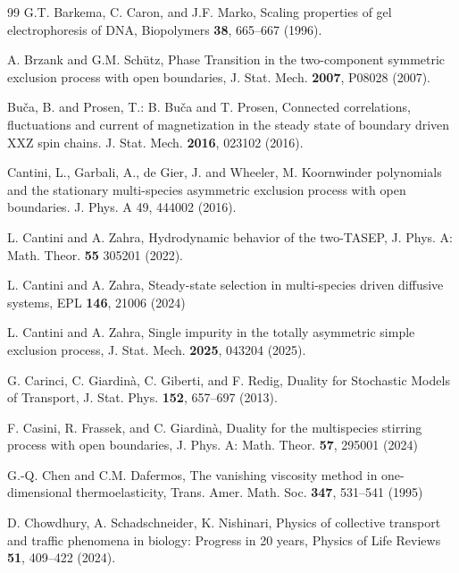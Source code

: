 \documentclass[12pt]{article}
\begin{document}
\begin{thebibliography}{99}
 G.T. Barkema, C. Caron, and J.F. Marko,  Scaling properties of gel electrophoresis of DNA, Biopolymers \textbf{38}, 665--667 (1996).

A. Brzank and G.M. Sch\"utz,
Phase Transition in the two-component symmetric exclusion process 
with open boundaries, 
J. Stat. Mech. \textbf{2007}, P08028 (2007).

 Bu\v{c}a, B. and Prosen, T.: B. Bu\v{c}a and T. Prosen, Connected correlations, fluctuations and current of magnetization in the steady state of boundary driven XXZ spin chains. J. Stat. Mech. \textbf{2016}, 023102 (2016).


Cantini, L., Garbali, A., de Gier, J. and Wheeler, M. 
Koornwinder polynomials and the stationary multi-species asymmetric exclusion process with open boundaries. 
J. Phys. A 49, 444002 (2016).

L. Cantini and A. Zahra, 
Hydrodynamic behavior of the two-TASEP,
J. Phys. A: Math. Theor. \textbf{55} 305201 (2022).

L. Cantini and A. Zahra,
Steady-state selection in multi-species driven diffusive systems, 
EPL \textbf{146}, 21006 (2024)

L. Cantini and A. Zahra,
Single impurity in the totally asymmetric simple exclusion process,
J. Stat. Mech. \textbf{2025}, 043204 (2025).


 G. Carinci, C. Giardin\`a, C. Giberti, and F. Redig, Duality for Stochastic Models of Transport, J. Stat. Phys. \textbf{152}, 657--697 (2013).

 F. Casini, R. Frassek, and C. Giardin\`a, Duality for the multispecies stirring process with open boundaries, J. Phys. A: Math. Theor. \textbf{57}, 295001 (2024)

G.-Q. Chen and C.M. Dafermos, 
The vanishing viscosity method in one-dimensional thermoelasticity, 
Trans. Amer. Math. Soc. \textbf{347}, 531–541 (1995)

D. Chowdhury, A. Schadschneider, K. Nishinari,
Physics of collective transport and traffic phenomena in biology: Progress in 20 years,
Physics of Life Reviews \textbf{51},
409--422 (2024).


\end{thebibliography}
\end{document}
